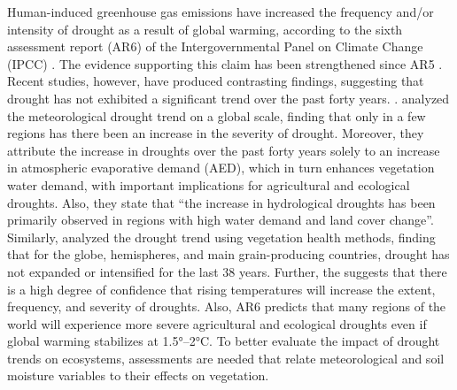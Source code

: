 \documentclass[
  authoryear,
  preprint,
  3p,
  onecolumn]{elsarticle}
\begin{document}
Human-induced greenhouse gas emissions have increased the frequency
and/or intensity of drought as a result of global warming, according to
the sixth assessment report (AR6) of the Intergovernmental Panel on
Climate Change (IPCC) \citep{IPCC2023}. The evidence supporting this
claim has been strengthened since AR5 \citep{IPCC2013}. Recent studies,
however, have produced contrasting findings, suggesting that drought has
not exhibited a significant trend over the past forty years.
\citep{Vicente-Serrano2022, Kogan2020}. \citet{Vicente-Serrano2022}
analyzed the meteorological drought trend on a global scale, finding
that only in a few regions has there been an increase in the severity of
drought. Moreover, they attribute the increase in droughts over the past
forty years solely to an increase in atmospheric evaporative demand
(AED), which in turn enhances vegetation water demand, with important
implications for agricultural and ecological droughts. Also, they state
that ``the increase in hydrological droughts has been primarily observed
in regions with high water demand and land cover change''. Similarly,
\citet{Kogan2020} analyzed the drought trend using vegetation health
methods, finding that for the globe, hemispheres, and main
grain-producing countries, drought has not expanded or intensified for
the last 38 years. Further, the \citet{IPCC2021} suggests that there is
a high degree of confidence that rising temperatures will increase the
extent, frequency, and severity of droughts. Also, AR6 \citep{IPCC2023}
predicts that many regions of the world will experience more severe
agricultural and ecological droughts even if global warming stabilizes
at 1.5°--2°C. To better evaluate the impact of drought trends on
ecosystems, assessments are needed that relate meteorological and soil
moisture variables to their effects on vegetation.
\end{document}
